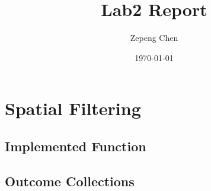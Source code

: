 \documentclass[14pt]{article}
\title{Lab2 Report}
\author{Zepeng Chen}
\date{\today}
\begin{document}
	\maketitle
	\tableofcontents
	\section{Spatial Filtering}
	\subsection{Implemented Function}
	
	\newcommand{\RNum}[1]{\uppercase\expandafter{\romannumeral #1\relax}}
	\subsection{Outcome Collections \RNum{1}}
	\newpage
\end{document}
